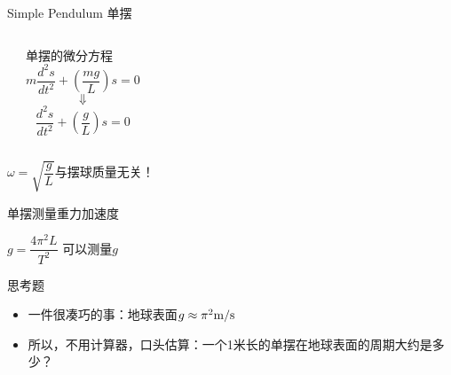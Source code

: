 \documentclass{beamer}
\begin{document}
\begin{frame}{Simple Pendulum 单摆}
	\begin{columns}
	\begin{center}
	\end{center}
	\begin{block}{单摆的微分方程}
		\[m \frac{d^2 s}{dt^2} + \left(\frac{mg}{L}\right)s = 0\]
		\[\Downarrow\]
		\[\frac{d^2 s}{dt^2} + \left(\frac{g}{L}\right)s = 0\]
	\end{block}
	\end{columns}
	
	\medskip
	\begin{center}
		\LARGE{$\omega = \sqrt{\dfrac{g}{L}}$与摆球质量无关！}
	\end{center}
\end{frame}

\begin{frame}{单摆测量重力加速度}
	\begin{center}
		\LARGE{$g = \dfrac{4\pi^2 L}{T^2}$ 可以测量$g$}
	\end{center}

	\begin{exampleblock}{思考题}
		\begin{itemize}
			\item 一件很凑巧的事：地球表面$g \approx \pi^2 {\rm m/s}$
			\item 所以，不用计算器，口头估算：一个1米长的单摆在地球表面的周期大约是多少？
		\end{itemize}
	\end{exampleblock}
\end{frame}
\end{document}
